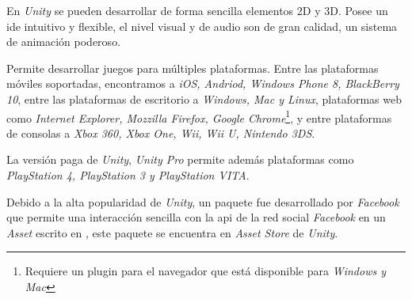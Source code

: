 En \textit{Unity} se pueden desarrollar de forma sencilla elementos 2D y 3D.
Posee un \Gls{ide} intuitivo y flexible, el nivel visual y de audio son de gran
calidad, un sistema de animación poderoso. 

Permite desarrollar juegos para múltiples plataformas. Entre las plataformas
móviles soportadas, encontramos a \textit{iOS, Andriod, Windows Phone 8,
    BlackBerry 10}, entre las plataformas de escritorio a \textit{Windows, Mac y
    Linux}, plataformas web como \textit{Internet Explorer, Mozzilla Firefox,
    Google Chrome}\footnote{Requiere un plugin para el navegador que está
    disponible para \textit{Windows y Mac}}, y entre plataformas de consolas a
\textit{Xbox 360, Xbox One, Wii, Wii U, Nintendo 3DS}.

La versión paga de \textit{Unity}, \textit{Unity Pro} permite además plataformas
como \textit{PlayStation 4, PlayStation 3 y PlayStation VITA}.

Debido a la alta popularidad de \textit{Unity}, un paquete fue desarrollado por
\textit{Facebook} que permite una interacción sencilla con la \Gls{api} de la
red social \textit{Facebook} en un \textit{Asset} escrito en \cs{}, este paquete
se encuentra en \textit{Asset Store} de \textit{Unity}.
